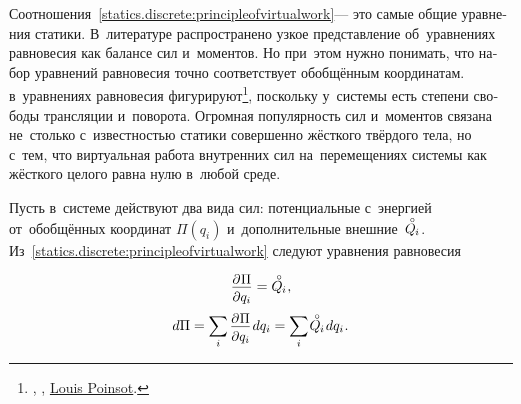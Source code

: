 \begin{otherlanguage}{russian}
Соотношения~\eqref{statics.discrete:principleofvirtualwork}\:--- это самые общие уравнения статики. В~литературе распространено узкое представление об~уравнениях равновесия как балансе сил и~моментов. Но при~этом нужно понимать, что набор уравнений равновесия точно соответствует обобщённым координатам.
~
в~уравнениях равновесия фигурируют\footnote{, ,    
\href{https://gallica.bnf.fr/ark:/12148/bpt6k6213152z.texteImage}{}
\href{https://en.wikipedia.org/wiki/Louis_Poinsot}{Louis Poinsot}.}\hspace{-1ex},
поскольку у~системы есть степени свободы трансляции и~поворота. Огромная популярность сил и~моментов связана не~столько с~известностью статики совершенно жёсткого твёрдого тела, но с~тем, что виртуальная работа внутренних сил на~перемещениях системы как жёсткого целого равна нулю в~любой среде.

Пусть в~системе действуют два вида сил: потенциальные с~энергией от~обобщённых координат ${\Pi(q_i)}$ и~дополнительные внешние~${\mathcircabove{Q}_{\hspace{-0.1ex}i}}$. Из~\eqref{statics.discrete:principleofvirtualwork} следуют уравнения равновесия

\nopagebreak\vspace{-0.1em}\begin{equation}\label{staticequilibriumwithpotentialenergy}
\scalebox{0.96}{$ \displaystyle \frac{\raisemath{-0.15em}{\partial \hspace{.1ex} \Pi}}{\raisemath{-0.1em}{\partial q_i}} $} = \mathcircabove{Q}_{\hspace{-0.1ex}i}
\hspace{.1ex},
\end{equation}
\nopagebreak\vspace{.1em}\begin{equation*}
d\Pi = \scalebox{0.95}[1]{$\displaystyle \sum_{\smash{i}}$} \hspace{.32ex}
\scalebox{0.96}{$ \displaystyle \frac{\raisemath{-0.15em}{\partial \hspace{.1ex} \Pi}}{\raisemath{-0.1em}{\partial q_i}} $} \hspace{.2ex} dq_i
= \scalebox{0.95}[1]{$\displaystyle \sum_{\smash{i}}$} \hspace{.2ex} \mathcircabove{Q}_{\hspace{-0.1ex}i} \hspace{.2ex} dq_i
\hspace{.1ex} .
\end{equation*}


\end{otherlanguage}
